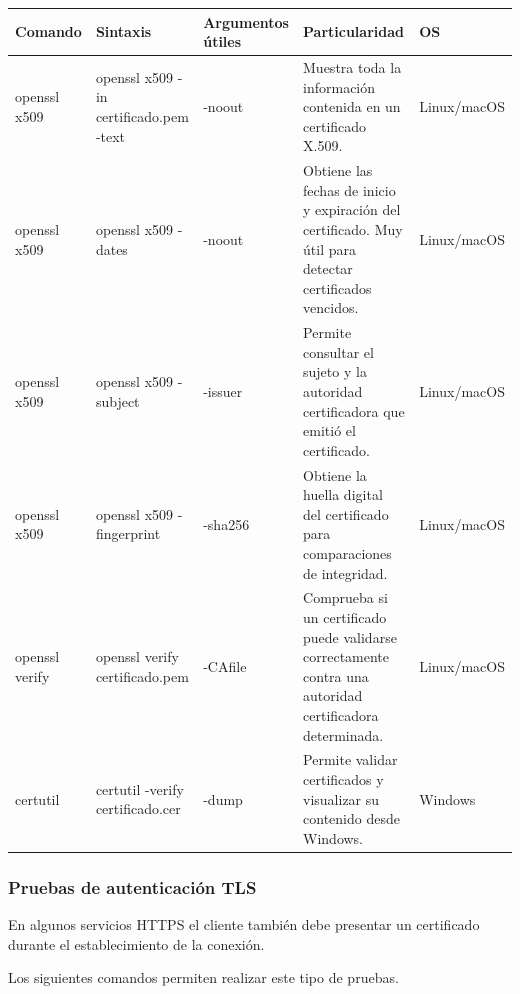 \documentclass[a4paper,10pt]{article}
\begin{document}
\begin{longtable}{|p{2.8cm}|p{3cm}|p{4cm}|p{5.6cm}|p{1.5cm}|}

\hline
Comando &
Sintaxis &
Argumentos útiles &
Particularidad &
OS
\\
\hline
\endhead

openssl x509 &
openssl x509 -in certificado.pem -text &
-noout &
Muestra toda la información contenida en un certificado X.509. &
Linux/macOS
\\
\hline

openssl x509 &
openssl x509 -dates &
-noout &
Obtiene las fechas de inicio y expiración del certificado. Muy útil para detectar certificados vencidos. &
Linux/macOS
\\
\hline

openssl x509 &
openssl x509 -subject &
-issuer &
Permite consultar el sujeto y la autoridad certificadora que emitió el certificado. &
Linux/macOS
\\
\hline

openssl x509 &
openssl x509 -fingerprint &
-sha256 &
Obtiene la huella digital del certificado para comparaciones de integridad. &
Linux/macOS
\\
\hline

openssl verify &
openssl verify certificado.pem &
-CAfile &
Comprueba si un certificado puede validarse correctamente contra una autoridad certificadora determinada. &
Linux/macOS
\\
\hline

certutil &
certutil -verify certificado.cer &
-dump &
Permite validar certificados y visualizar su contenido desde Windows. &
Windows
\\
\hline

\end{longtable}



\subsubsection{Pruebas de autenticación TLS}

En algunos servicios HTTPS el cliente también debe presentar un certificado
durante el establecimiento de la conexión.

Los siguientes comandos permiten realizar este tipo de pruebas.
\end{document}
